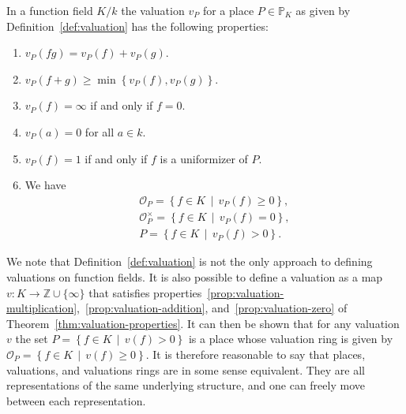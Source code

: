 \begin{theorem}%
  \label{thm:valuation-properties}
  In a function field \(K / k\) the valuation \(v_{P}\) for a place \(P \in \mathbb{P}_{K}\) as given by Definition~\ref{def:valuation} has the following properties:
  \begin{enumerate}[label = {(\arabic*)}]
    \item%
      \label{prop:valuation-multiplication}
      \(v_{P}(fg) = v_{P}(f) + v_{P}(g)\).

    \item%
      \label{prop:valuation-addition}
      \(v_{P}(f + g) \geq \min{\left\{v_{P}(f), v_{P}(g)\right\}}\).

    \item%
      \label{prop:valuation-zero}
      \(v_{P}(f) = \infty\) if and only if \(f = 0\).

    \item
      \(v_{P}(a) = 0\) for all \(a \in k\).

    \item
      \(v_{P}(f) = 1\) if and only if \(f\) is a uniformizer of \(P\).

    \item
      We have
      \begin{align*}
        \mathcal{O}_{P} = \left\{ f \in K \,\middle|\, v_{P}(f) \geq 0 \right\},       \\
        \mathcal{O}_{P}^{\times} = \left\{ f \in K \,\middle|\, v_{P}(f) = 0 \right\}, \\
        P = \left\{ f \in K \,\middle|\, v_{P}(f) > 0 \right\}.
      \end{align*}
  \end{enumerate}
\end{theorem}

We note that Definition~\ref{def:valuation} is not the only approach to defining valuations on function fields. It is also possible to define a valuation as a map \(v: K \to \mathbb{Z} \cup \{\infty\}\) that satisfies properties~\ref{prop:valuation-multiplication},~\ref{prop:valuation-addition}, and~\ref{prop:valuation-zero} of Theorem~\ref{thm:valuation-properties}. It can then be shown that for any valuation \(v\) the set \(P = \left\{ f \in K \,\middle|\, v(f) > 0 \right\}\) is a place whose valuation ring is given by \(\mathcal{O}_{P} = \left\{ f \in K \,\middle|\, v(f) \geq 0 \right\}\). It is therefore reasonable to say that places, valuations, and valuations rings are in some sense equivalent. They are all representations of the same underlying structure, and one can freely move between each representation.

